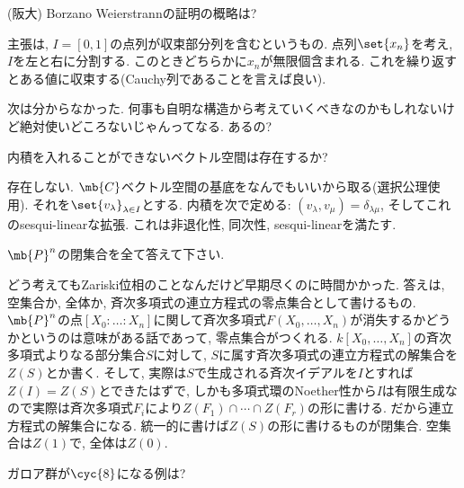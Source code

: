 \begin{prob} (阪大)
Borzano Weierstrannの証明の概略は? 
\end{prob}
\begin{ans}
主張は, $I=[0,1]$の点列が収束部分列を含むというもの. 点列$\set{x_n}$を考え, $I$を左と右に分割する. このときどちらかに$x_n$が無限個含まれる. これを繰り返すとある値に収束する(Cauchy列であることを言えば良い). 
\end{ans}

次は分からなかった. 何事も自明な構造から考えていくべきなのかもしれないけど絶対使いどころないじゃんってなる. あるの?
\begin{prob}
内積を入れることができないベクトル空間は存在するか? 
\end{prob}
\begin{ans}
存在しない. $\mb{C}$ベクトル空間の基底をなんでもいいから取る(選択公理使用). それを$\set{v_{\lambda}}_{\lambda\in I}$とする. 内積を次で定める: $(v_{\lambda}, v_{\mu}) = \delta_{\lambda\mu}$, そしてこれのsesqui-linearな拡張. これは非退化性, 同次性, sesqui-linearを満たす. 
\end{ans}

\begin{prob}
$\mb{P}^{n}$の閉集合を全て答えて下さい. 
\end{prob}

\begin{ans} どう考えてもZariski位相のことなんだけど早期尽くのに時間かかった. 答えは, 空集合か, 全体か, 斉次多項式の連立方程式の零点集合として書けるもの. $\mb{P}^n$の点$[X_0:\dots: X_n]$に関して斉次多項式$F(X_0,\dots,X_n)$が消失するかどうかというのは意味がある話であって, 零点集合がつくれる. $k[X_0,\dots ,X_n]$の斉次多項式よりなる部分集合$S$に対して, $S$に属す斉次多項式の連立方程式の解集合を$Z(S)$とか書く. そして, 実際は$S$で生成される斉次イデアルを$I$とすれば$Z(I) = Z(S)$とできたはずで, しかも多項式環のNoether性から$I$は有限生成なので実際は斉次多項式$F_i$により$Z(F_1) \cap \cdots \cap Z(F_r)$の形に書ける. だから連立方程式の解集合になる. 統一的に書けば$Z(S)$の形に書けるものが閉集合. 空集合は$Z(1)$で, 全体は$Z(0)$. 
\end{ans}

\begin{prob}
ガロア群が$\cyc{8}$になる例は? 
\end{prob}

